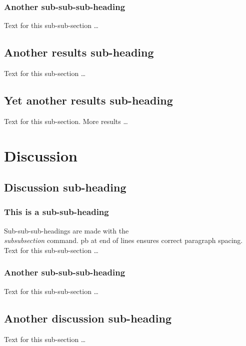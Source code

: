 \documentclass[10pt]{bmc_article}
\newenvironment{bmcformat}{\begin{raggedright}\baselineskip20pt\sloppy\setboolean{publ}{false}}{\end{raggedright}\baselineskip20pt\sloppy}
\begin{document}
\begin{bmcformat}
    \subsubsection*{Another sub-sub-sub-heading}
      Text for this sub-sub-section \ldots

  \subsection*{Another results sub-heading}
    Text for this sub-section \ldots

  \subsection*{Yet another results sub-heading}
    Text for this sub-section.  More results \ldots


\section*{Discussion}
  \subsection*{Discussion sub-heading}
    \subsubsection*{This is a sub-sub-heading}
      Sub-sub-sub-headings are made with the \textsl{\\subsubsection} command. \pb
      pb at end of lines ensures correct paragraph spacing.\pb
	  Text for this sub-sub-section \ldots
    \subsubsection*{Another sub-sub-sub-heading}
      Text for this sub-sub-section \ldots

  \subsection*{Another discussion sub-heading}
    Text for this sub-section \ldots


\end{bmcformat}
\end{document}
